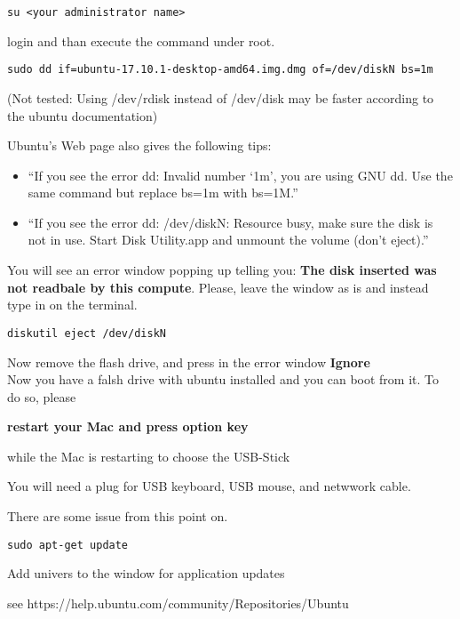 \begin{lstlisting}
su <your administrator name>
\end{lstlisting}

login and than execute the command under root.

\begin{lstlisting}
sudo dd if=ubuntu-17.10.1-desktop-amd64.img.dmg of=/dev/diskN bs=1m
\end{lstlisting}

(Not tested: Using /dev/rdisk instead of /dev/disk may be faster
according to the ubuntu documentation)

Ubuntu's Web page also gives the following tips:

\begin{itemize}
\item
  ``If you see the error dd: Invalid number `1m', you are using GNU dd.
  Use the same command but replace bs=1m with bs=1M.''
\item
  ``If you see the error dd: /dev/diskN: Resource busy, make sure the
  disk is not in use. Start Disk Utility.app and unmount the volume
  (don't eject).''
\end{itemize}

You will see an error window popping up telling you: \textbf{The disk
inserted was not readbale by this compute}. Please, leave the window as
is and instead type in on the terminal.

\begin{lstlisting}
diskutil eject /dev/diskN
\end{lstlisting}

Now remove the flash drive, and press in the error window
\textbf{Ignore}\\
Now you have a falsh drive with ubuntu installed and you can boot from
it. To do so, please

\textbf{restart your Mac and press option key}

while the Mac is restarting to choose the USB-Stick

You will need a plug for USB keyboard, USB mouse, and netwwork cable.

There are some issue from this point on.

\begin{lstlisting}
sudo apt-get update
\end{lstlisting}

Add univers to the window for application updates

see https://help.ubuntu.com/community/Repositories/Ubuntu

